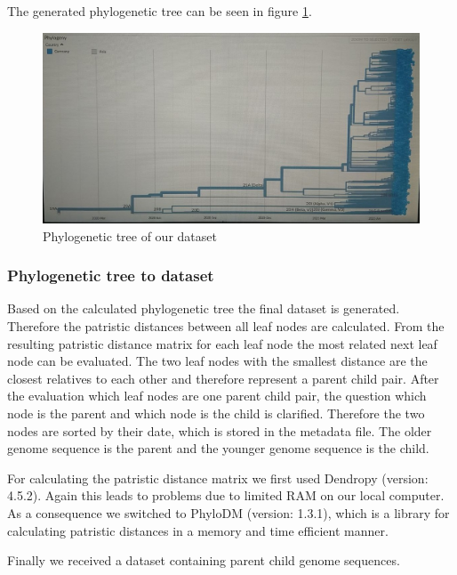 The generated phylogenetic tree can be seen in figure \ref{phylogeneticTree}.

\begin{figure}[ht]
	\centering
	\includegraphics[width=1.0\linewidth]{figures/phylogeneticTree.jpg}
	\caption{Phylogenetic tree of our dataset \cite{own representation}}
	\label{phylogeneticTree}
\end{figure}

\subsubsection{Phylogenetic tree to dataset}
\label{ch:approachAc}

Based on the calculated phylogenetic tree the final dataset is generated. Therefore the patristic distances between all leaf nodes are calculated. From the resulting patristic distance matrix for each leaf node the most related next leaf node can be evaluated. The two leaf nodes with the smallest distance are the closest relatives to each other and therefore represent a parent child pair. After the evaluation which leaf nodes are one parent child pair, the question which node is the parent and which node is the child is clarified. Therefore the two nodes are sorted by their date, which is stored in the metadata file. The older genome sequence is the parent and the younger genome sequence is the child.

For calculating the patristic distance matrix we first used Dendropy (version: 4.5.2). Again this leads to problems due to limited RAM on our local computer. As a consequence we switched to PhyloDM (version: 1.3.1), which is a library for calculating patristic distances in a memory and time efficient manner.

Finally we received a dataset containing parent child genome sequences.


